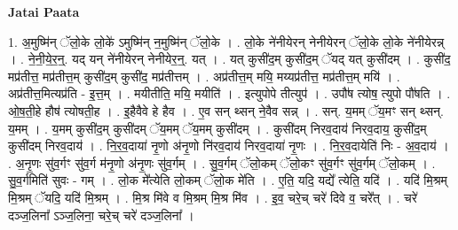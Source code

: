 \documentclass[17pt]{extarticle}
\begin{document}
\textbf{Jatai Paata} \newline

1. अ॒मुष्मि॑न् ॅलो॒के लो॒के॑ ऽमुष्मि॑न् न॒मुष्मि॑न् ॅलो॒के । . लो॒के ने॑नीयेरन् नेनीयेरन् ॅलो॒के लो॒के ने॑नीयेरन्न् । . ने॒नी॒ये॒र॒न्॒. यद् यन् ने॑नीयेरन् नेनीयेर॒न्॒. यत् । . यत् कुसी॑द॒म् कुसी॑द॒म् ॅयद् यत् कुसी॑दम् । . कुसी॑द॒ मप्र॑तीत्त॒ मप्र॑तीत्त॒म् कुसी॑द॒म् कुसी॑द॒ मप्र॑तीत्तम् । . अप्र॑तीत्त॒म् मयि॒ मय्यप्र॑तीत्त॒ मप्र॑तीत्त॒म् मयि॑ । . अप्र॑तीत्त॒मित्यप्र॑ति - इ॒त्त॒म् । . मयीतीति॒ मयि॒ मयीति॑ । . इत्युपोपे तीत्युप॑ । . उपौ॑ष त्योष॒ त्युपो पौ॑षति । . ओ॒ष॒ती॒हे हौष॑ त्योषती॒ह । . इ॒हैवैवे हे हैव । . ए॒व सन् थ्सन् ने॒वैव सन्न् । . सन्. य॒मम् ॅय॒मꣳ सन् थ्सन्. य॒मम् । . य॒मम् कुसी॑द॒म् कुसी॑दम् ॅय॒मम् ॅय॒मम् कुसी॑दम् । . कुसी॑दम् निरव॒दाय॑ निरव॒दाय॒ कुसी॑द॒म् कुसी॑दम् निरव॒दाय॑ । . नि॒र॒व॒दाया॑ नृ॒णो अ॑नृ॒णो नि॑रव॒दाय॑ निरव॒दाया॑ नृ॒णः । . नि॒र॒व॒दायेति॑ निः - अ॒व॒दाय॑ । . अ॒नृ॒णः सु॑व॒र्गꣳ सु॑व॒र्ग म॑नृ॒णो अ॑नृ॒णः सु॑व॒र्गम् । . सु॒व॒र्गम् ॅलो॒कम् ॅलो॒कꣳ सु॑व॒र्गꣳ सु॑व॒र्गम् ॅलो॒कम् । . सु॒व॒र्गमिति॑ सुवः - गम् । . लो॒क मे᳚त्येति लो॒कम् ॅलो॒क मे॑ति । . ए॒ति॒ यदि॒ यद्ये᳚ त्येति॒ यदि॑ । . यदि॑ मि॒श्रम् मि॒श्रम् ॅयदि॒ यदि॑ मि॒श्रम् । . मि॒श्र मि॑वे व मि॒श्रम् मि॒श्र मि॑व । . इ॒व॒ चरे॒च् चरे॑ दिवे व॒ चरे᳚त् । . चरे॑ दञ्ज॒लिना᳚ ऽञ्ज॒लिना॒ चरे॒च् चरे॑ दञ्ज॒लिना᳚ । \newline
\end{document}
